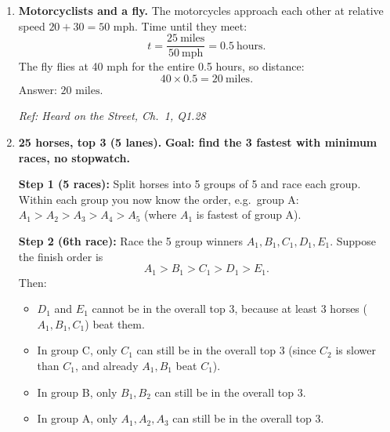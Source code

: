 \documentclass[11pt]{article}
\begin{document}
\begin{enumerate}[label=\textbf{\arabic*.}]
\medskip
\noindent\textbf{Decoding:}
Encode the outcomes as a 5-vector \(o\in\{-1,0,1\}^5\):
\[
o_k=
\begin{cases}
+1 & \text{if left side is heavier on weighing }k,\\
-1 & \text{if right side is heavier on weighing }k,\\
0 & \text{if balanced.}
\end{cases}
\]
Then:
\begin{itemize}
\item If \(o=c_i\), coin \(i\) is \textbf{heavier}.
\item If \(o=-c_i\), coin \(i\) is \textbf{lighter}.
\end{itemize}
This works because a heavier counterfeit coin pushes the balance toward the side where it was placed, while a lighter one pushes the balance toward the opposite side.

\medskip
\noindent\textbf{Conclusion:} 5 weighings suffice and 4 cannot, so the optimal worst-case cost is
\[
\boxed{5 \text{ weighings } \Rightarrow \$500.}
\]

\hfill{\small\textit{Ref: Heard on the Street, Ch.\ 1, Q1.18}}

\item \textbf{Motorcyclists and a fly.}
The motorcycles approach each other at relative speed \(20+30=50\) mph.
Time until they meet:
\[
t=\frac{25\ \text{miles}}{50\ \text{mph}}=0.5\ \text{hours}.
\]
The fly flies at 40 mph for the entire 0.5 hours, so distance:
\[
40\times 0.5=20\ \text{miles}.
\]
Answer: \(\boxed{20\text{ miles}}\).

\hfill{\small\textit{Ref: Heard on the Street, Ch.\ 1, Q1.28}}

\item \textbf{25 horses, top 3 (5 lanes).}
\textbf{Goal: find the 3 fastest with minimum races, no stopwatch.}

\medskip
\noindent\textbf{Step 1 (5 races):} Split horses into 5 groups of 5 and race each group.  
Within each group you now know the order, e.g.\ group A: \(A_1>A_2>A_3>A_4>A_5\) (where \(A_1\) is fastest of group A).

\medskip
\noindent\textbf{Step 2 (6th race):} Race the 5 group winners \(A_1,B_1,C_1,D_1,E_1\).  
Suppose the finish order is
\[
A_1 > B_1 > C_1 > D_1 > E_1.
\]
Then:
\begin{itemize}
\item \(D_1\) and \(E_1\) cannot be in the overall top 3, because at least 3 horses (\(A_1,B_1,C_1\)) beat them.
\item In group C, only \(C_1\) can still be in the overall top 3 (since \(C_2\) is slower than \(C_1\), and already \(A_1,B_1\) beat \(C_1\)).
\item In group B, only \(B_1,B_2\) can still be in the overall top 3.
\item In group A, only \(A_1,A_2,A_3\) can still be in the overall top 3.
\end{itemize}


\end{enumerate}
\end{document}
